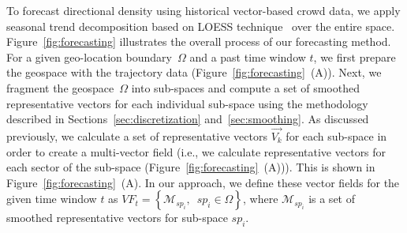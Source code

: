 To forecast directional density using historical vector-based crowd data, we apply seasonal trend decomposition based on LOESS technique~\cite{Cleveland:1990:SAS} over the entire space. %
Figure~\ref{fig:forecasting} illustrates the overall process of our forecasting method.
For a given geo-location boundary~$\Omega$ and a past time window $t$, 
we first prepare 
the geospace with the trajectory data (Figure~\ref{fig:forecasting}~(A)).
Next, we fragment the geospace~$\Omega$ into sub-spaces and compute a set of smoothed representative vectors for each individual sub-space using the methodology described in Sections~\ref{sec:discretization} and~\ref{sec:smoothing}.
As discussed previously, we 
calculate a set of representative vectors $\vec{V_k}$ for each sub-space in order to create a multi-vector field (i.e., we calculate representative vectors for each sector of the sub-space (Figure~\ref{fig:forecasting}~(A))).
This is shown in Figure~\ref{fig:forecasting}~(A). %
In our approach, we define these vector fields for the given time window $t$ as 
$VF_t = \left\{\mathcal{M}_{sp_{i}}, \enspace sp_{i} \in \Omega \right\}$, 
where $\mathcal{M}_{sp_{i}}$ is a set of smoothed representative vectors for sub-space $sp_i$.
